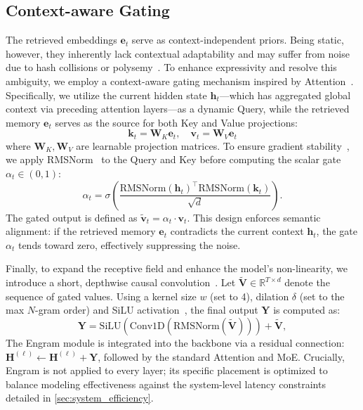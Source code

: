 \subsection{Context-aware Gating}
\label{sec:engram_fusion}
The retrieved embeddings $\mathbf{e}_t$ serve as context-independent priors. Being static, however, they inherently lack contextual adaptability and may suffer from noise due to hash collisions or polysemy~\citep{haber-poesio-2024-polysemy}.
To enhance expressivity and resolve this ambiguity, we employ a context-aware gating mechanism inspired by Attention~\citep{vaswani2017attention,bahdanau2014neural}. Specifically, we utilize the current hidden state $\mathbf{h}_t$—which has aggregated global context via preceding attention layers—as a dynamic Query, while the retrieved memory $\mathbf{e}_t$ serves as the source for both Key and Value projections:
\begin{equation}
    \mathbf{k}_t = \mathbf{W}_K \mathbf{e}_t, \quad \mathbf{v}_t = \mathbf{W}_V \mathbf{e}_t
\end{equation}
where $\mathbf{W}_K, \mathbf{W}_V$ are learnable projection matrices. To ensure gradient stability~\citep{pmlr-v202-dehghani23a}, we apply RMSNorm~\citep{zhang2019root} to the Query and Key before computing the scalar gate $\alpha_t \in (0, 1)$: 
\begin{equation}
    \alpha_t = \sigma\left( \frac{\text{RMSNorm}(\mathbf{h}_t)^\top  \text{RMSNorm}(\mathbf{k}_t)}{\sqrt{d}} \right).
\end{equation}
The gated output is defined as $\tilde{\mathbf{v}}_t = \alpha_t \cdot \mathbf{v}_t$. This design enforces semantic alignment: if the retrieved memory $\mathbf{e}_t$ contradicts the current context $\mathbf{h}_t$, the gate $\alpha_t$ tends toward zero, effectively suppressing the noise.

Finally, to expand the receptive field and enhance the model's non-linearity, we introduce a short, depthwise causal convolution~\citep{gu2021efficiently,peng2023rwkv}. Let $\tilde{\mathbf{V}} \in \mathbb{R}^{T \times d}$ denote the sequence of gated values. Using a kernel size $w$ (set to 4), dilation $\delta$ (set to the max $N$-gram order) and SiLU activation~\citep{elfwing2018sigmoid}, the final output $\mathbf{Y}$ is computed as: 
\begin{equation}
    \mathbf{Y} = \text{SiLU}\left( \text{Conv1D}( \text{RMSNorm}(\tilde{\mathbf{V}}) ) \right) + \tilde{\mathbf{V}}, 
\end{equation}
The Engram module is integrated into the backbone via a residual connection: $\mathbf{H}^{(\ell)} \leftarrow \mathbf{H}^{(\ell)} + \mathbf{Y}$, followed by the standard Attention and MoE. 
Crucially, Engram is not applied to every layer; its specific placement is optimized to balance modeling effectiveness against the system-level latency constraints detailed in \autoref{sec:system_efficiency}.


